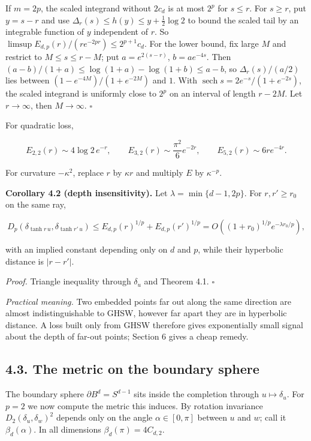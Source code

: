 \documentclass[
  british,
  11pt,
  a4paper,
]{article}
\begin{document}
If \(m=2p\), the scaled integrand without \(2c_d\) is at most \(2^p\)
for \(s\leq r\). For \(s\geq r\), put \(y=s-r\) and use
\(\Delta_r(s)\leq h(y)\leq y+\tfrac12\log2\) to bound the scaled tail by
an integrable function of \(y\) independent of \(r\). So
\(\limsup E_{d,p}(r)/(re^{-2pr})\leq2^{p+1}c_d\). For the lower bound,
fix large \(M\) and restrict to \(M\leq s\leq r-M\); put
\(a=e^{2(s-r)}\), \(b=ae^{-4s}\). Then
\((a-b)/(1+a)\leq\log(1+a)-\log(1+b)\leq a-b\), so \(\Delta_r(s)/(a/2)\)
lies between \((1-e^{-4M})/(1+e^{-2M})\) and \(1\). With
\(\operatorname{sech}s=2e^{-s}/(1+e^{-2s})\), the scaled integrand is
uniformly close to \(2^p\) on an interval of length \(r-2M\). Let
\(r\to\infty\), then \(M\to\infty\). \(\square\)

For quadratic loss,

\[
E_{2,2}(r)\sim4\log2\,e^{-r},\qquad
E_{3,2}(r)\sim\frac{\pi^2}{6}e^{-2r},\qquad
E_{5,2}(r)\sim6r e^{-4r}.
\tag{4.7}
\]

For curvature \(-\kappa^2\), replace \(r\) by \(\kappa r\) and multiply
\(E\) by \(\kappa^{-p}\).

\textbf{Corollary 4.2 (depth insensitivity).} Let
\(\lambda=\min\{d-1,2p\}\). For \(r,r'\geq r_0\) on the same ray,

\[
D_p(\delta_{\tanh r\,u},\delta_{\tanh r'\,u})\leq E_{d,p}(r)^{1/p}+E_{d,p}(r')^{1/p}=O\!\left((1+r_0)^{1/p}e^{-\lambda r_0/p}\right),
\]

with an implied constant depending only on \(d\) and \(p\), while their
hyperbolic distance is \(|r-r'|\).

\emph{Proof.} Triangle inequality through \(\delta_u\) and Theorem 4.1.
\(\square\)

\emph{Practical meaning.} Two embedded points far out along the same
direction are almost indistinguishable to GHSW, however far apart they
are in hyperbolic distance. A loss built only from GHSW therefore gives
exponentially small signal about the depth of far-out points; Section 6
gives a cheap remedy.

\subsection{4.3. The metric on the boundary
sphere}\label{the-metric-on-the-boundary-sphere}

The boundary sphere \(\partial B^d=S^{d-1}\) sits inside the completion
through \(u\mapsto\delta_u\). For \(p=2\) we now compute the metric this
induces. By rotation invariance \(D_2(\delta_u,\delta_w)^2\) depends
only on the angle \(\alpha\in[0,\pi]\) between \(u\) and \(w\); call it
\(\beta_d(\alpha)\). In all dimensions \(\beta_d(\pi)=4C_{d,2}\).
\end{document}
